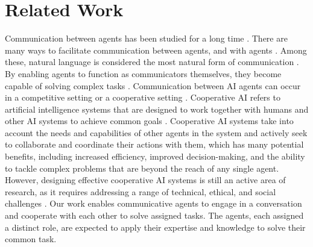 \vspace{-0.25cm}
\section{Related Work}
\vspace{-0.25cm}
\label{sec:related}


Communication between agents has been studied for a long time \cite{minsky1988society,minsky2007emotion}. There are many ways to facilitate communication between agents, and with agents \cite{finin1994kqml,poslad2007specifying,russell2010artificial}. Among these, natural language is considered the most natural form of communication \cite{russell2010artificial}.
By enabling agents to function as communicators themselves, they become capable of solving complex tasks \cite{Tan1997MultiAgentRL, Panait2005CooperativeML, lowe2017multi,andreas2022language,foerster2016learning,sukhbaatar2016learning,mordatch2018emergence,havrylov2017emergence,du2021learning,sheng2022learning,nakano2021webgpt,shuster2022blenderbot,amelia2022improving,hosseini2020simple,ahn2022do,huang2022inner,abramson2020imitating,siddaharth2021lila,huang2022language,li2022pretrained,reed2022gato}. Communication between AI agents can occur in a competitive setting \cite{tesauro1995temporal, silver2017mastering} or a cooperative setting \cite{hadfield2016cooperative,dafoe2020open,bard2020hanabi,zhu2023chatgpt,lo2023cheap}. Cooperative AI refers to artificial intelligence systems that are designed to work together with humans and other AI systems to achieve common goals \cite{Claus1998TheDO, wooldridge2009introduction}. Cooperative AI systems take into account the needs and capabilities of other agents in the system and actively seek to collaborate and coordinate their actions with them, which has many potential benefits, including increased efficiency, improved decision-making, and the ability to tackle complex problems that are beyond the reach of any single agent. However, designing effective cooperative AI systems is still an active area of research, as it requires addressing a range of technical, ethical, and social challenges \cite{dafoe2020open}. Our work enables communicative agents to engage in a conversation and cooperate with each other to solve assigned tasks. The agents, each assigned a distinct role, are expected to apply their expertise and knowledge to solve their common task.



